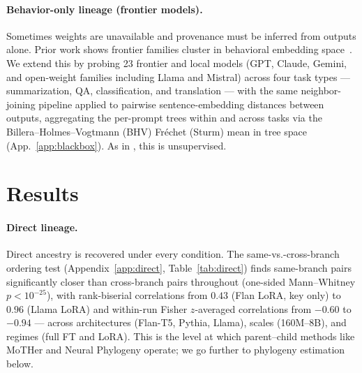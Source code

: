 \documentclass{article}
\theoremstyle{definition}
\theoremstyle{plain}
\begin{document}



\paragraph{Behavior-only lineage (frontier models).}
\label{sec:exp:blackbox}

Sometimes weights are unavailable and provenance must be inferred from outputs alone. Prior work shows frontier families cluster in behavioral embedding space~\citep{wu2026llmdna, yax2025phylolm}. We extend this by probing 23 frontier and local models (GPT, Claude, Gemini, and open-weight families including Llama and Mistral) across four task types --- summarization, QA, classification, and translation --- with the same neighbor-joining pipeline applied to pairwise sentence-embedding distances between outputs, aggregating the per-prompt trees within and across tasks via the Billera--Holmes--Vogtmann (BHV) Fr\'echet (Sturm) mean in tree space~\citep{billera2001geometry, willis2019confidence} (App.~\ref{app:blackbox}). As in \cite{yax2025phylolm}, this is unsupervised.


\section{Results}
\label{sec:results}


\paragraph{Direct lineage.}

Direct ancestry is recovered under every condition. The same-vs.-cross-branch ordering test
(Appendix~\ref{app:direct}, Table~\ref{tab:direct}) finds same-branch pairs significantly closer than
cross-branch pairs throughout (one-sided Mann--Whitney $p<10^{-25}$), with rank-biserial correlations
from $0.43$ (Flan LoRA, key only) to $0.96$ (Llama LoRA) and within-run Fisher $z$-averaged correlations
from $-0.60$ to $-0.94$ --- across architectures (Flan-T5, Pythia, Llama), scales (160M--8B), and regimes
(full FT and LoRA). This is the level at which parent--child methods like MoTHer \citep{horwitz2025mother}
and Neural Phylogeny \citep{yu2025neural} operate;
we go further to phylogeny estimation below.
\end{document}
